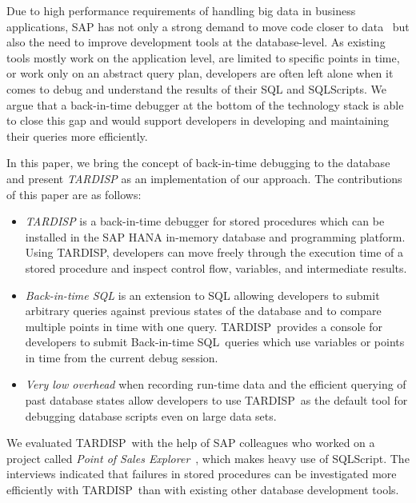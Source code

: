 \documentclass[english,conference]{IEEEtran}
\newcommand{\tool}{TAR\-DISP}
\newcommand{\SQLextension}{Back-in-time SQL}
\begin{document}
Due to high performance requirements of handling big data in business applications, SAP has not only a strong demand to move code closer to data~\cite{plattner2015memory} but also the need to improve development tools at the database-level. 
As existing tools mostly work on the application level, are limited to specific points in time, or work only on an abstract query plan, developers are often left alone when it comes to debug and understand the results of their SQL and SQLScripts.
We argue that a back-in-time debugger at the bottom of the technology stack is able to close this gap and would support developers in developing and maintaining their queries more efficiently. 

In this paper, we bring the concept of back-in-time debugging to the database and present \emph{\tool} as an implementation of our approach.
The contributions of this paper are as follows:
\begin{itemize}
	\item \emph{\tool} is a back-in-time debugger for stored procedures which can be installed in the SAP HANA in-memory database and programming platform.
		Using \tool, developers can move freely through the execution time of a stored procedure and inspect control flow, variables, and intermediate results.
	
	\item \emph{\SQLextension} is an extension to SQL allowing developers to submit arbitrary queries against previous states of the database 
		and to compare multiple points in time with one query.
		\tool\ provides a console for developers to submit \SQLextension\ queries which use variables or points in time from the current debug session.

	\item \emph{Very low overhead} when recording run-time data and the efficient querying of past database states allow developers to use \tool\ as the default tool for debugging database scripts even on large data sets.
	
\end{itemize}

We evaluated \tool\ with the help of SAP colleagues who worked on a project called \emph{Point of Sales Explorer}~\cite{plattner2015memory}, which makes heavy use of SQLScript. 
The interviews indicated that failures in stored procedures can be investigated more efficiently with \tool\ than with existing other database development tools.
\end{document}
